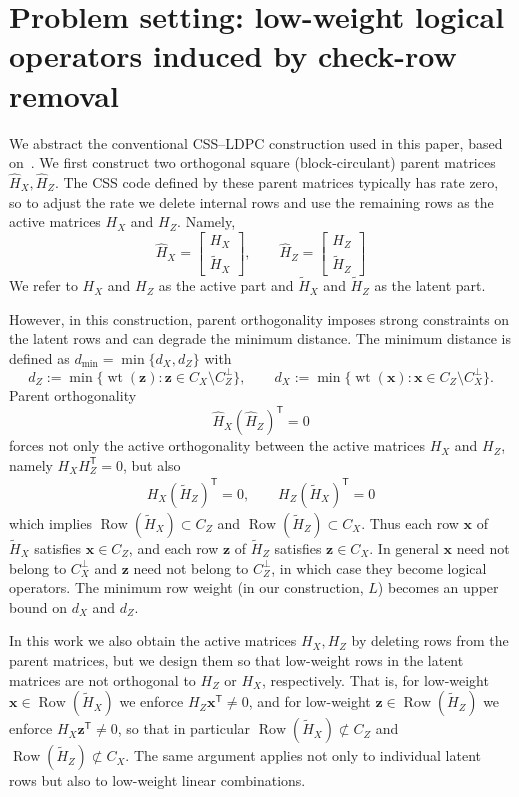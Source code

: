 \documentclass[a4paper,onecolumn,11pt,accepted=2026-08-03]{quantumarticle}
\newcommand{\Hful}{\hat{H}}
\newcommand{\Hres}{\tilde{H}}
\DeclareMathOperator{\Row}{Row}
\DeclareMathOperator{\wt}{wt}
\renewcommand\[{\begin{equation}}
\renewcommand\]{\end{equation}}
\theoremstyle{definition}
\begin{document}
\section{Problem setting: low-weight logical operators induced by check-row removal}
\label{sec:deleted-checks-logicals}

We abstract the conventional CSS--LDPC construction used in this paper, based on~\cite{MacKay2004,HagiwaraImai2007}. We first construct two orthogonal square (block-circulant) parent matrices $\Hful_X,\Hful_Z$. The CSS code defined by these parent matrices typically has rate zero, so to adjust the rate we delete internal rows and use the remaining rows as the active matrices $H_X$ and $H_Z$. Namely,
\[
\Hful_X=
\begin{bmatrix}
H_X\\
\Hres_X
\end{bmatrix},\qquad
\Hful_Z=
\begin{bmatrix}
H_Z\\
\Hres_Z
\end{bmatrix}
\]
We refer to $H_X$ and $H_Z$ as the active part and $\Hres_X$ and $\Hres_Z$ as the latent part.

However, in this construction, parent orthogonality imposes strong constraints on the latent rows and can degrade the minimum distance. The minimum distance is defined as $d_{\min}=\min\{d_X,d_Z\}$ with
\[
 d_Z:=\min\{\wt(\boldsymbol{z}):\boldsymbol{z}\in C_X\setminus C_Z^{\perp}\},\qquad
 d_X:=\min\{\wt(\boldsymbol{x}):\boldsymbol{x}\in C_Z\setminus C_X^{\perp}\}.
\]
Parent orthogonality
\[
\Hful_X(\Hful_Z)^{\mathsf T}=0
\]
forces not only the active orthogonality between the active matrices $H_X$ and $H_Z$, namely $H_XH_Z^{\mathsf T}=0$, but also
\begin{align}
 H_X(\Hres_Z)^{\mathsf T}=0,\qquad H_Z(\Hres_X)^{\mathsf T}=0\label{021224_10Jan26}
\end{align}
which implies $\Row(\Hres_X)\subset C_Z$ and $\Row(\Hres_Z)\subset C_X$. Thus each row $\boldsymbol{x}$ of $\Hres_X$ satisfies $\boldsymbol{x}\in C_Z$, and each row $\boldsymbol{z}$ of $\Hres_Z$ satisfies $\boldsymbol{z}\in C_X$. In general $\boldsymbol{x}$ need not belong to $C_X^{\perp}$ and $\boldsymbol{z}$ need not belong to $C_Z^{\perp}$, in which case they become logical operators. The minimum row weight (in our construction, $L$) becomes an upper bound on $d_X$ and $d_Z$.

In this work we also obtain the active matrices $H_X,H_Z$ by deleting rows from the parent matrices, but we design them so that low-weight rows in the latent matrices are not orthogonal to $H_Z$ or $H_X$, respectively. That is, for low-weight $\boldsymbol{x}\in\Row(\Hres_X)$ we enforce $H_Z\boldsymbol{x}^{\mathsf T}\neq 0$, and for low-weight $\boldsymbol{z}\in\Row(\Hres_Z)$ we enforce $H_X\boldsymbol{z}^{\mathsf T}\neq 0$, so that in particular
$\Row(\Hres_X)\not\subset C_Z$ and $\Row(\Hres_Z)\not\subset C_X$.
The same argument applies not only to individual latent rows but also to low-weight linear combinations.
\end{document}
